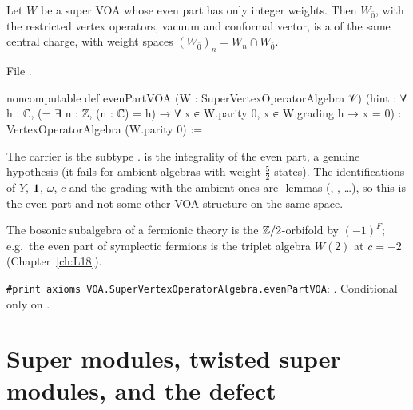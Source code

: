 \begin{theorem}\label{l17:thm:evenpart}
Let $W$ be a super VOA whose even part has only integer weights. Then $W_{\bar0}$, with the restricted
vertex operators, vacuum and conformal vector, is a  of the same central
charge, with weight spaces $(W_{\bar0})_n=W_n\cap W_{\bar0}$.
\end{theorem}
\noindent File .
\begin{leancode}
noncomputable def evenPartVOA (W : SuperVertexOperatorAlgebra 𝒱)
    (hint : ∀ h : ℂ, (¬ ∃ n : ℤ, (n : ℂ) = h) → ∀ x ∈ W.parity 0, x ∈ W.grading h → x = 0) :
    VertexOperatorAlgebra (W.parity 0) :=
\end{leancode}
\begin{dictionary}
The carrier is the subtype .  is the integrality of the even part, a
genuine hypothesis (it fails for ambient algebras with weight-$\frac52$ states). The identifications
of $Y$, $\mathbf{1}$, $\omega$, $c$ and the grading with the ambient ones are -lemmas
(, , \dots), so this is the even part and not some
other VOA structure on the same space.
\end{dictionary}
\begin{physics}
The bosonic subalgebra of a fermionic theory is the ${\mathbb{Z}}/2$-orbifold by $(-1)^F$; e.g.\ the even
part of symplectic fermions is the triplet algebra $W(2)$ at $c=-2$ (Chapter~\ref{ch:L18}).
\end{physics}
\begin{status}
\texttt{\#print axioms VOA.SuperVertexOperatorAlgebra.evenPartVOA}: . Conditional only on .
\end{status}

\section{Super modules, twisted super modules, and the defect}\label{l17:sec:modules}

